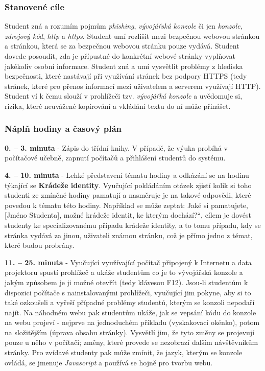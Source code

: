 \documentclass[a4paper, 12pt]{article}
\providecommand{\uv}[1]{\quotedblbase #1\textquotedblleft}
\begin{document}
\subsubsection{Stanovené cíle}
Student zná a rozumím pojmům \textit{phishing}, \textit{vývojářská konzole} či jen \textit{konzole}, \textit{zdrojový kód}, \textit{http} a \textit{https}. Student umí rozlišit mezi bezpečnou webovou stránkou a stránkou, která se za bezpečnou webovou stránku pouze vydává. Student dovede posoudit, zda je přípustné do konkrétní webové stránky vyplňovat jakékoliv osobní informace. Student zná a umí vysvětlit problémy z hlediska bezpečnosti, které nastávají při využívání stránek bez podpory HTTPS (tedy stránek, které pro přenos informací mezi uživatelem a serverem využívají HTTP). Student ví k čemu slouží v prohlížeči tzv. \textit{vývojářká konzole} a uvědomuje si, rizika, které neuvážené kopírování a vkládání textu do ní může přinášet.

\subsubsection{Náplň hodiny a časový plán}
\indent\textbf{0. -- 3. minuta} - Zápis do třídní knihy. V případě, že výuka probíhá v počítačové učebně, zapnutí počítačů a přihlášení studentů do systému.

\textbf{4. -- 10. minuta} - Lehké představení tématu hodiny a odkázání se na hodinu týkající se \textbf{Krádeže identity}. Vyučující pokládáním otázek zjistí kolik si toho studenti ze zmíněné hodiny pamatují a nasměruje je na takové odpovědi, které povedou k tématu této hodiny. Například se může zeptat: \uv{Jaké si pamatujete, [Jméno Studenta], možné krádeže identit, ke kterým dochází?}, cílem je dovést studenty ke specializovanému případu krádeže identity, a to tomu případu, kdy se stránka vydává za jinou, uživateli známou stránku, což je přímo jedno z témat, které budou probrány.

\textbf{11. -- 25. minuta} - Vyučující využívající počítač připojený k Internetu a data projektoru spustí prohlížeč a ukáže studentům co je to vývojářská konzole a jakým způsobem je ji možné otevřít (tedy klávesou F12). Jsou-li studentům k dispozici počítače s nainstalovanými prohlížeči, vyučující jim pokyne, aby si to také ozkoušeli a vyřeší případné problémy studentů, kterým se konzoli nepodaří najít. Na náhodném webu pak studentům ukáže, jak se vepsání kódu do konzole na webu projeví - nejprve na jednoduchém příkladu (vyskakovací okénko), potom na složitějším (úprava obsahu stránky). Vysvětlí jim, že tyto změny se projevují pouze u něho v počítači; změny, které provede se nezobrazí dalším návštěvníkům stránky. Pro zvídavé studenty pak může zmínit, že jazyk, kterým se konzole ovládá, se jmenuje \textit{Javascript} a používá se hojně pro tvorbu webu. 
\end{document}
